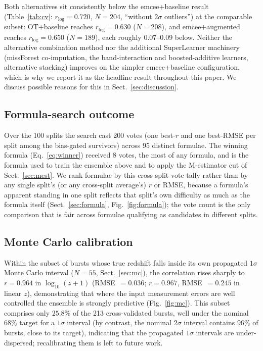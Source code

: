 \documentclass{aa}
\newcommand{\logz}{\log_{10}(z+1)}
\begin{document}
Both alternatives sit consistently below the emcee+baseline result (Table~\ref{tab:cv}:
$r_{\log}=0.720$, $N=204$, ``without $2\sigma$ outliers'') at the comparable
subset: OT+baseline reaches $r_{\log}=0.630$ ($N=208$), and emcee+augmented reaches
$r_{\log}=0.650$ ($N=189$), each roughly 0.07--0.09 below. Neither the alternative
combination method nor the additional SuperLearner machinery (missForest
co-imputation, the band-interaction and boosted-additive learners, alternative
stacking) improves on the simpler emcee+baseline configuration, which is why we
report it as the headline result throughout this paper. We discuss possible
reasons for this in Sect.~\ref{sec:discussion}.

\subsection{Formula-search outcome}
\label{sec:res-formula}

Over the 100 splits the search cast 200 votes (one best-$r$ and one best-RMSE per
split among the bias-gated survivors) across 95 distinct formulae. The winning
formula (Eq.~\ref{eq:winner}) received 8 votes, the most of any formula, and is the
formula used to train the ensemble above and to apply the M-estimator cut of
Sect.~\ref{sec:mest}. We rank formulae by this cross-split vote tally rather than by
any single split's (or any cross-split average's) $r$ or RMSE, because a formula's
apparent standing in one split reflects that split's own difficulty as much as the
formula itself (Sect.~\ref{sec:formula}, Fig.~\ref{fig:formula}); the vote count is
the only comparison that is fair across formulae qualifying as candidates in
different splits.

\subsection{Monte Carlo calibration}
\label{sec:res-mc}

Within the subset of bursts whose true redshift falls inside its own propagated
$1\sigma$ Monte Carlo interval ($N=55$, Sect.~\ref{sec:mc}), the correlation rises
sharply to $r=0.964$ in $\logz$ (RMSE~$=0.036$; $r=0.967$, RMSE~$=0.245$ in linear
$z$), demonstrating that where the input measurement errors are well controlled the
ensemble is strongly predictive (Fig.~\ref{fig:mc}). This subset comprises only
$25.8\%$ of the 213 cross-validated bursts, well under the nominal $68\%$ target for
a $1\sigma$ interval (by contrast, the nominal $2\sigma$ interval contains $96\%$ of
bursts, close to its target), indicating that the propagated $1\sigma$ intervals are
under-dispersed; recalibrating them is left to future work.
\end{document}
